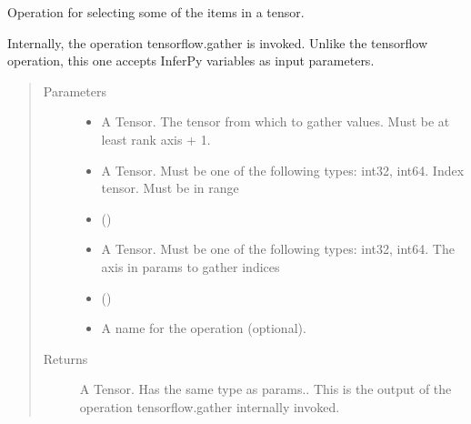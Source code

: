 \documentclass[letterpaper,10pt,english]{sphinxmanual}
\begin{document}
\begin{fulllineitems}
\label{\detokenize{modules/inferpy.util:inferpy.util.ops.gather}}
Operation for selecting some of the items in a tensor.

Internally, the operation tensorflow.gather is invoked. Unlike the tensorflow operation, this one
accepts InferPy variables as input parameters.
\begin{quote}\begin{description}
\item[{Parameters}] \leavevmode\begin{itemize}
\item {} 
 \textendash{} A Tensor. The tensor from which to gather values. Must be at least rank axis + 1.

\item {} 
 \textendash{} A Tensor. Must be one of the following types: int32, int64. Index tensor. Must be in range

\item {} 
\sphinxstyleliteralstrong{{[}}\sphinxstyleliteralstrong{{]}}\sphinxstyleliteralstrong{)}\sphinxstyleliteralstrong{} (\sphinxstyleliteralemphasis{{[}}\sphinxstyleliteralemphasis{,}) \textendash{} 

\item {} 
 \textendash{} A Tensor. Must be one of the following types: int32, int64. The axis in params to gather indices

\item {} 
 () \textendash{} 

\item {} 
 \textendash{} A name for the operation (optional).

\end{itemize}

\item[{Returns}] \leavevmode
A Tensor. Has the same type as params.. This is the output of the operation
tensorflow.gather internally invoked.

\end{description}\end{quote}

\end{fulllineitems}
\end{document}
